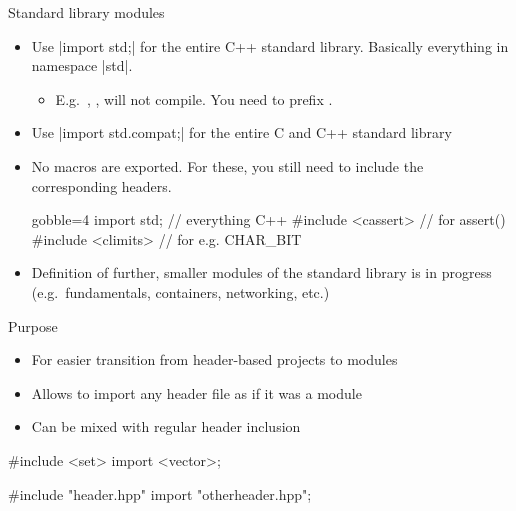 \begin{frame}[fragile]
  \begin{block}{Standard library modules}
    \begin{itemize}
      \item Use \cppinline|import std;| for the entire C++ standard library. Basically everything in namespace \cppinline|std|.
      \begin{itemize}
        \item E.g.\ , ,  will not compile. You need to prefix .
      \end{itemize}
      \item Use \cppinline|import std.compat;| for the entire C and C++ standard library
      \item No macros are exported. For these, you still need to include the corresponding headers.
      \begin{cppcode*}{gobble=4}
        import std;        // everything C++
        #include <cassert> // for assert()
        #include <climits> // for e.g. CHAR_BIT
      \end{cppcode*}
      \item Definition of further, smaller modules of the standard library is in progress (e.g.\ fundamentals, containers, networking, etc.)
    \end{itemize}
  \end{block}
\end{frame}

\begin{frame}[fragile]
    \begin{block}{Purpose}
      \begin{itemize}
      \item For easier transition from header-based projects to modules
      \item Allows to import any header file as if it was a module
      \item Can be mixed with regular header inclusion
      \end{itemize}
    \end{block}
    \begin{cppcode}
      #include <set>
      import <vector>;

      #include "header.hpp"
      import "otherheader.hpp";
    \end{cppcode}
\end{frame}

